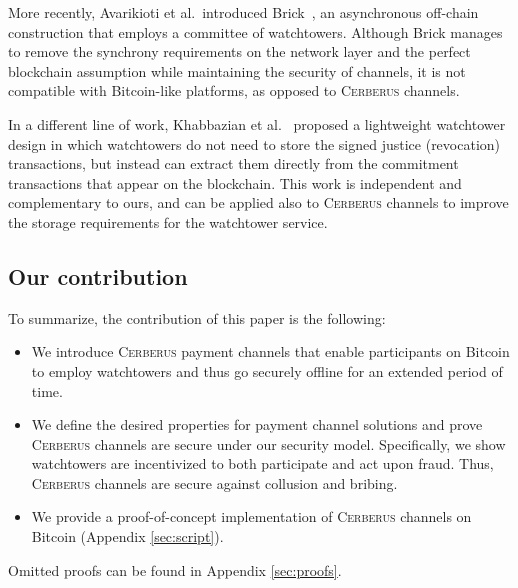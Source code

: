 \documentclass[runningheads]{llncs}
\newcommand{\authnote}[3]{{ \footnotesize \bf{#1[#2: #3]~}}} %
\newcommand{\edit}[1]{\authnote{\color{blue}}{edit}{#1}}
\newcommand{\sys}{\textsc{Cerberus}\xspace}
\begin{document}
More recently, Avarikioti et al.\ introduced Brick~\cite{avarikioti2019brick}, an asynchronous off-chain construction that employs a committee of watchtowers. Although Brick manages to remove the synchrony requirements on the network layer and the perfect blockchain assumption while maintaining the security of channels, it is not compatible with Bitcoin-like platforms, as opposed to \sys channels.

In a different line of work, Khabbazian  et al.~\cite{khabbazian2019outpost} proposed a lightweight watchtower design in which watchtowers do not need to store the signed justice (revocation) transactions, but instead can extract them  directly from the commitment transactions that appear on the blockchain.
This work is independent and complementary to ours, and can be applied also to \sys channels to improve the storage requirements for the watchtower service.

\subsection{Our contribution} To summarize, the contribution of this paper is the following:
\begin{itemize}

    \item We introduce \sys payment channels that 
enable participants on Bitcoin to employ watchtowers and thus go securely offline for an extended period of time.     
    \item We define the desired properties for payment channel solutions and prove \sys channels are secure under our security model. Specifically, we show  watchtowers are incentivized to both participate and act upon fraud. Thus, \sys channels are secure against collusion and bribing.
    \item We provide a proof-of-concept implementation of \sys channels on Bitcoin (Appendix \ref{sec:script}).
\end{itemize}
Omitted proofs can be found in Appendix \ref{sec:proofs}.
\end{document}
